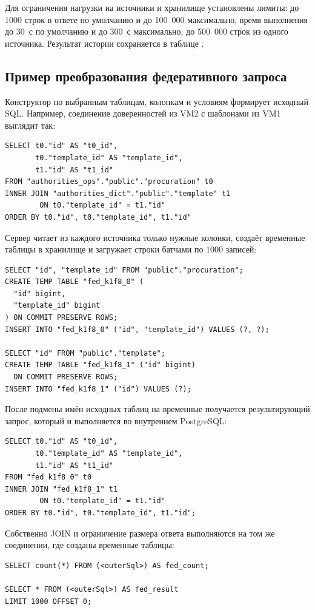\documentclass[../main.tex]{subfiles}
\begin{document}
Для ограничения нагрузки на источники и хранилище установлены
лимиты: до 1000 строк в ответе по умолчанию и до 100~000
максимально, время выполнения до 30~с по умолчанию и до 300~с
максимально, до 500~000 строк из одного источника. Результат
истории сохраняется в таблице .

\subsection{Пример преобразования федеративного запроса}

Конструктор по выбранным таблицам, колонкам и условиям формирует
исходный SQL. Например, соединение доверенностей из VM2 с шаблонами
из VM1 выглядит так:

{\small
\begin{verbatim}
SELECT t0."id" AS "t0_id",
       t0."template_id" AS "template_id",
       t1."id" AS "t1_id"
FROM "authorities_ops"."public"."procuration" t0
INNER JOIN "authorities_dict"."public"."template" t1
        ON t0."template_id" = t1."id"
ORDER BY t0."id", t0."template_id", t1."id"
\end{verbatim}
}

Сервер читает из каждого источника только нужные колонки,
создаёт временные таблицы в хранилище и загружает строки батчами
по 1000 записей:

{\small
\begin{verbatim}
SELECT "id", "template_id" FROM "public"."procuration";
CREATE TEMP TABLE "fed_k1f8_0" (
  "id" bigint,
  "template_id" bigint
) ON COMMIT PRESERVE ROWS;
INSERT INTO "fed_k1f8_0" ("id", "template_id") VALUES (?, ?);

SELECT "id" FROM "public"."template";
CREATE TEMP TABLE "fed_k1f8_1" ("id" bigint)
  ON COMMIT PRESERVE ROWS;
INSERT INTO "fed_k1f8_1" ("id") VALUES (?);
\end{verbatim}
}

После подмены имён исходных таблиц на временные получается
результирующий запрос, который и выполняется во внутреннем PostgreSQL:

{\small
\begin{verbatim}
SELECT t0."id" AS "t0_id",
       t0."template_id" AS "template_id",
       t1."id" AS "t1_id"
FROM "fed_k1f8_0" t0
INNER JOIN "fed_k1f8_1" t1
        ON t0."template_id" = t1."id"
ORDER BY t0."id", t0."template_id", t1."id";
\end{verbatim}
}

Собственно JOIN и ограничение размера ответа выполняются на том же
соединении, где созданы временные таблицы:

{\small
\begin{verbatim}
SELECT count(*) FROM (<outerSql>) AS fed_count;

SELECT * FROM (<outerSql>) AS fed_result
LIMIT 1000 OFFSET 0;
\end{verbatim}
}
\end{document}
